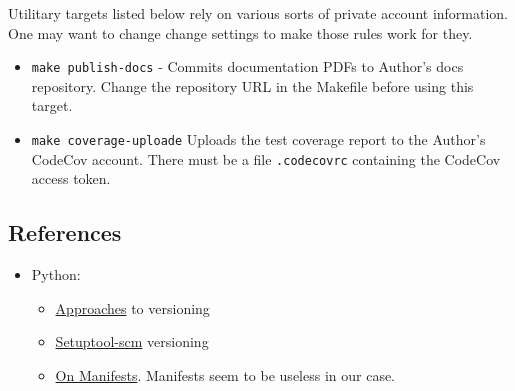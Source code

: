 \begin{itemize}
    Utilitary targets listed below rely on various sorts of private account
    information. One may want to change change settings to make those rules work
    for they.

    \begin{itemize}

      \item \texttt{make publish-docs} - Commits documentation PDFs to
        Author's docs repository. Change the repository URL in the Makefile
        before using this target.

      \item \texttt{make coverage-uploade} Uploads the test coverage report to
        the Author's CodeCov account. There must be a file \texttt{.codecovrc}
        containing the CodeCov access token.

    \end{itemize}

\end{itemize}


\subsection{References}

\begin{itemize}
  \item Python:
    \begin{itemize}
      \item
        \href{https://packaging.python.org/guides/single-sourcing-package-version/}{Approaches}
        to versioning
      \item
        \href{https://pypi.org/project/setuptools-scm/}{Setuptool-scm} versioning
      \item
        \href{https://docs.python.org/3.7/distutils/sourcedist.html#manifest-template}{On Manifests}. Manifests seem to be useless in our case.
    \end{itemize}
\end{itemize}



